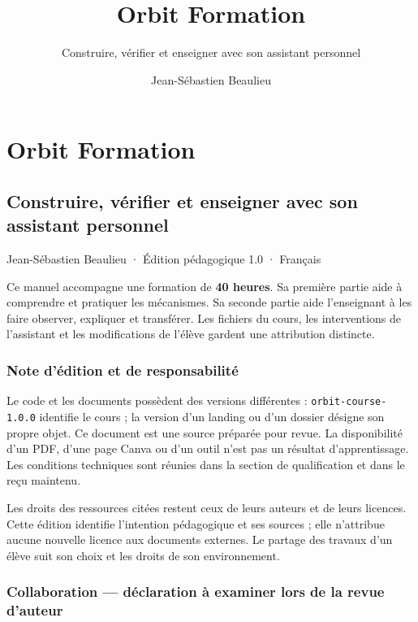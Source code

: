 \documentclass[
  canadien,
  11pt,
  a4paper,
]{report}
\title{Orbit Formation}
\subtitle{Construire, vérifier et enseigner avec son assistant
personnel}
\author{Jean-Sébastien Beaulieu}
\date{}
\begin{document}
\maketitle

{
\setcounter{tocdepth}{2}
\tableofcontents
}
\chapter{Orbit Formation}\label{orbit-formation}

\section{Construire, vérifier et enseigner avec son assistant
personnel}\label{construire-vuxe9rifier-et-enseigner-avec-son-assistant-personnel}

Jean-Sébastien Beaulieu · Édition pédagogique 1.0 · Français

Ce manuel accompagne une formation de \textbf{40 heures}. Sa première
partie aide à comprendre et pratiquer les mécanismes. Sa seconde partie
aide l'enseignant à les faire observer, expliquer et transférer. Les
fichiers du cours, les interventions de l'assistant et les modifications
de l'élève gardent une attribution distincte.

\subsection{Note d'édition et de
responsabilité}\label{note-duxe9dition-et-de-responsabilituxe9}

Le code et les documents possèdent des versions différentes :
\texttt{orbit-course-1.0.0} identifie le cours ; la version d'un landing
ou d'un dossier désigne son propre objet. Ce document est une source
préparée pour revue. La disponibilité d'un PDF, d'une page Canva ou d'un
outil n'est pas un résultat d'apprentissage. Les conditions techniques
sont réunies dans la section de qualification et dans le reçu maintenu.

Les droits des ressources citées restent ceux de leurs auteurs et de
leurs licences. Cette édition identifie l'intention pédagogique et ses
sources ; elle n'attribue aucune nouvelle licence aux documents
externes. Le partage des travaux d'un élève suit son choix et les droits
de son environnement.

\subsection{Collaboration --- déclaration à examiner lors de la revue
d'auteur}\label{collaboration-duxe9claration-uxe0-examiner-lors-de-la-revue-dauteur}
\end{document}
